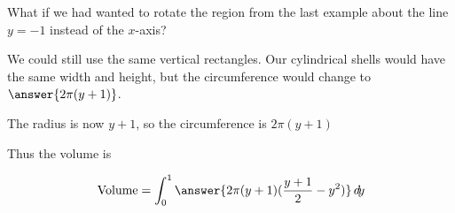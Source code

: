 \documentclass{ximera}
\begin{document}
\begin{example}
	What if we had wanted to rotate the region from the last example about the line $y = -1$ instead of the $x$-axis?

\begin{explanation}
We could still use the same vertical rectangles.  Our cylindrical shells would have the same width and height, but the circumference would change to $\answer{2\pi(y+1)}$.

\begin{hint}
	The radius is now $y+1$, so the circumference is $2\pi(y+1)$
\end{hint}

Thus the volume is 

\[
\textrm{Volume} = \int_0^1 \answer{2\pi (y+1) (\frac{y+1}{2} - y^2)}\d y
\]
\end{explanation}


\end{example}
\end{document}
